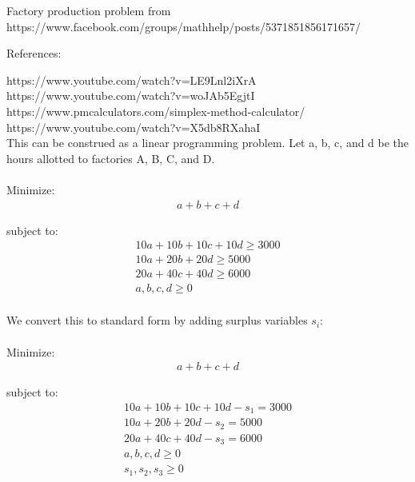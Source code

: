 \documentclass{article}
\begin{document}
Factory production problem from https://www.facebook.com/groups/mathhelp/posts/5371851856171657/

References:

https://www.youtube.com/watch?v=LE9Lnl2iXrA\\
https://www.youtube.com/watch?v=woJAb5EgjtI\\
https://www.pmcalculators.com/simplex-method-calculator/\\
https://www.youtube.com/watch?v=X5db8RXahaI\\


This can be construed as a linear programming problem.  Let a, b, c, and d be the hours allotted to factories A, B, C, and D.
\\
\\
Minimize:
\begin{equation*}
\begin{aligned}
a + b + c + d
\end{aligned}
\end{equation*}

subject to:
\begin{equation*}
\begin{aligned}
10a + 10b + 10c + 10d \geq 3000\\
10a + 20b + 20d \geq 5000\\
20a + 40c + 40d \geq 6000\\
a, b, c, d \geq 0\\
\end{aligned}
\end{equation*}

We convert this to standard form by adding surplus variables $s_i$:
\\
\\
Minimize:
\begin{equation*}
\begin{aligned}
a + b + c + d
\end{aligned}
\end{equation*}

subject to:
\begin{equation*}
\begin{aligned}
10a + 10b + 10c + 10d - s_1 = 3000\\
10a + 20b + 20d - s_2 = 5000\\
20a + 40c + 40d - s_3 = 6000\\
a, b, c, d \geq 0\\
s_1, s_2, s_3 \geq 0\\
\end{aligned}
\end{equation*}
\end{document}
